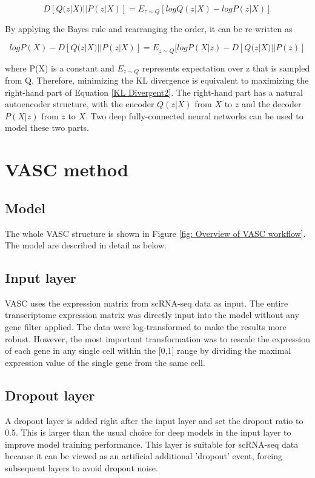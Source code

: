 \documentclass[12 pts]{article}
\begin{document}
\begin{equation}
D[Q(z|X)||P(z|X)] = E_{z\sim Q}[log Q(z|X)- log P(z|X)]
\label{KL Divergent1}
\end{equation}

By applying the Bayes rule and rearranging the order, it can be re-written as

\begin{equation}
log P(X)- D[Q(z|X)||P(z|X)] = E_{z\sim Q}[log P(X|z) - D[Q(z|X)||P(z)]
\label{KL Divergent2}
\end{equation}

where P(X) is a constant and $E_{z\sim Q}$ represents expectation over z that is sampled from Q. Therefore, minimizing the KL divergence is equivalent to maximizing the right-hand part of Equation \ref{KL Divergent2}. The right-hand part has a natural autoencoder structure, with the encoder $Q(z|X)$ from $X$ to $z$ and the decoder $P(X|z)$ from $z$ to $X$. Two deep fully-connected neural networks can be used to model these two parts.

\section{VASC method}
\subsection{Model}
The whole VASC structure is shown in Figure \ref{fig: Overview of VASC workflow}. The model  are described in detail as below.

\subsection*{Input layer}
VASC uses the expression matrix from scRNA-seq data as input. The entire transcriptome expression matrix was directly input into the model without any gene filter applied. The data were log-transformed to make the results more robust. However, the most important transformation was to rescale the expression of each gene in any single cell within the [0,1] range by dividing the maximal expression value of the single gene from the same cell.

\subsection*{Dropout layer}
A dropout layer is added right after the input layer and set the dropout ratio to 0.5. This is larger than the usual choice for deep models in the input layer to improve model training performance. This layer is suitable for scRNA-seq data because it can be viewed as an artificial additional 'dropout' event, forcing subsequent layers to avoid dropout noise.
\end{document}
